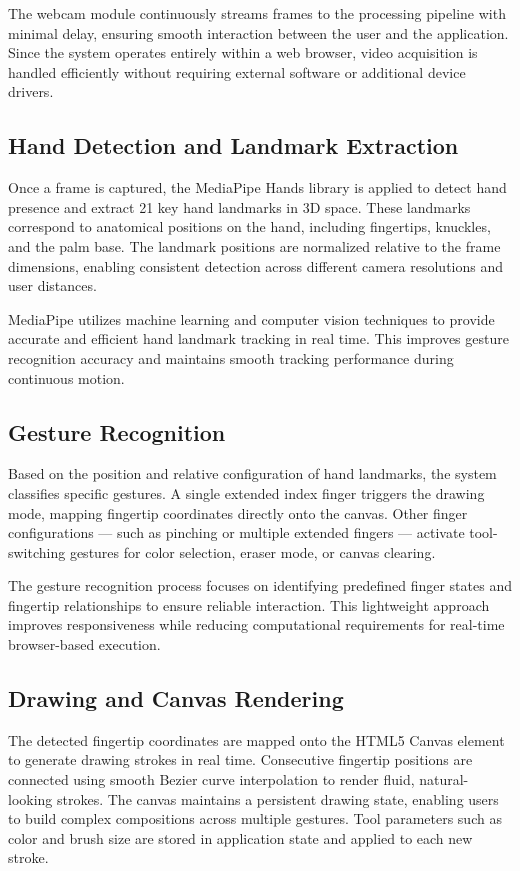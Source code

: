 \documentclass[conference]{IEEEtran}
\begin{document}
The webcam module continuously streams frames to the processing pipeline with minimal delay,
ensuring smooth interaction between the user and the application. Since the system operates
entirely within a web browser, video acquisition is handled efficiently without requiring external
software or additional device drivers.

\subsection{Hand Detection and Landmark Extraction}

Once a frame is captured, the MediaPipe Hands library is applied to detect hand presence and extract
21 key hand landmarks in 3D space. These landmarks correspond to anatomical positions on the
hand, including fingertips, knuckles, and the palm base. The landmark positions are normalized
relative to the frame dimensions, enabling consistent detection across different camera resolutions
and user distances.

MediaPipe utilizes machine learning and computer vision techniques to provide accurate and
efficient hand landmark tracking in real time. This improves gesture recognition accuracy and maintains smooth
tracking performance during continuous motion.

\subsection{Gesture Recognition}

Based on the position and relative configuration of hand landmarks, the system classifies specific
gestures. A single extended index finger triggers the drawing mode, mapping fingertip coordinates
directly onto the canvas. Other finger configurations — such as pinching or multiple extended
fingers — activate tool-switching gestures for color selection, eraser mode, or canvas clearing.

The gesture recognition process focuses on identifying predefined finger states and fingertip
relationships to ensure reliable interaction. This lightweight approach improves responsiveness while reducing computational
requirements for real-time browser-based execution.

\subsection{Drawing and Canvas Rendering}

The detected fingertip coordinates are mapped onto the HTML5 Canvas element to generate drawing
strokes in real time. Consecutive fingertip positions are connected using smooth Bezier curve
interpolation to render fluid, natural-looking strokes. The canvas maintains a persistent drawing
state, enabling users to build complex compositions across multiple gestures. Tool parameters such
as color and brush size are stored in application state and applied to each new stroke.
\end{document}
